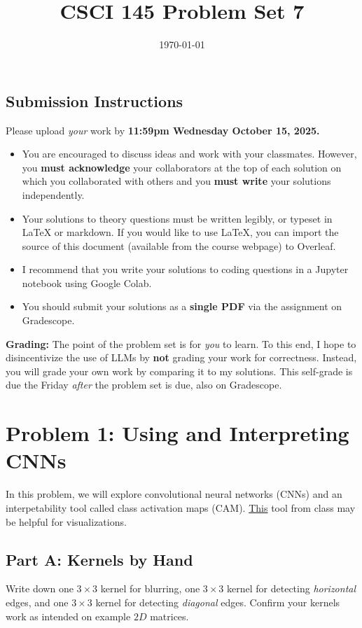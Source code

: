 \documentclass{article}
\title{CSCI 145 Problem Set 7}
\author{} %
\date{\today}
\begin{document}
\maketitle

\subsection*{Submission Instructions}

Please upload \textit{your} work by
\textbf{11:59pm Wednesday October 15, 2025.}
\begin{itemize}
\item You are encouraged to discuss ideas
and work with your classmates. However, you
\textbf{must acknowledge} your collaborators
at the top of each solution on which
you collaborated with others 
and you \textbf{must write} your solutions
independently.
\item Your solutions to theory questions must
be written legibly, or typeset in LaTeX or markdown.
If you would like to use LaTeX, you can import the source of this document (available from the course webpage) to Overleaf.
\item I recommend that you write your solutions to coding questions in a Jupyter notebook using Google Colab.
\item You should submit your solutions as a \textbf{single PDF} via the assignment on Gradescope.
\end{itemize}

\noindent
\textbf{Grading:} The point of the problem set is for \textit{you} to learn. To this end, I hope to disincentivize the use of LLMs by \textbf{not} grading your work for correctness. Instead, you will grade your own work by comparing it to my solutions. This self-grade is due the Friday \textit{after} the problem set is due, also on Gradescope.

\newpage
\section*{Problem 1: Using and Interpreting CNNs}

In this problem, we will explore convolutional neural networks (CNNs) and an interpetability tool called class activation maps (CAM).
\href{https://ezyang.github.io/convolution-visualizer/}{This} tool from class may be helpful for visualizations.

\subsection*{Part A: Kernels by Hand}
Write down one $3 \times 3$ kernel for blurring, one $3 \times 3$ kernel for detecting \textit{horizontal} edges, and one $3 \times 3$ kernel for detecting \textit{diagonal} edges.
Confirm your kernels work as intended on example $2D$ matrices.
\end{document}
